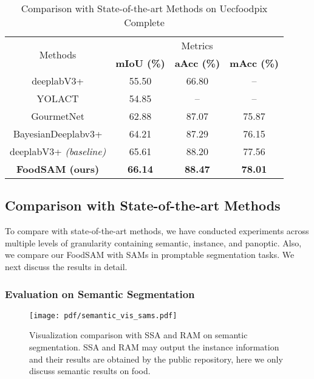 \documentclass[lettersize,journal]{IEEEtran}
\begin{document}
\begin{table}[]
\centering
\caption{Comparison with State-of-the-art Methods on Uecfoodpix Complete}
\begin{tabular}{c|ccc}
\hline
\multicolumn{1}{c}{\multirow{2}{*}{Methods}} & \multicolumn{3}{c}{Metrics}                   \\ \cline{2-4} 
\multicolumn{1}{c}{}                         & \textbf{mIoU (\%)} & \textbf{aAcc (\%)} & \textbf{mAcc (\%)} \\ \hline
deeplabV3+ \cite{chen2018encoder,okamoto2021uec}             & 55.50 & 66.80 & --    \\
YOLACT \cite{battini2023segmented}                 & 54.85 & --    & --    \\
GourmetNet\cite{sharma2021gourmetnet}             & 62.88 & 87.07    & 75.87    \\
BayesianDeeplabv3+\cite{aguilar2022bayesian}     & 64.21 & 87.29 & 76.15 \\
\hline
deeplabV3+ \emph{(baseline)} & 65.61 & 88.20 & 77.56 \\
\textbf{FoodSAM (ours)} & \textbf{66.14}    & \textbf{88.47}    & \textbf{78.01}    \\ \hline
\end{tabular}
\captionsetup{justification=centering}
\label{tab:uec sota}
\end{table} 
\subsection{Comparison with State-of-the-art Methods}
To compare with state-of-the-art methods, we have conducted experiments across multiple levels of granularity containing semantic, instance, and panoptic. 
Also, we compare our FoodSAM with SAMs in promptable segmentation tasks. 
We next discuss the results in detail.

\subsubsection*{Evaluation on Semantic Segmentation}


\begin{figure*}[tbh]
\centering
\newpage
\texttt{[image: pdf/semantic\_vis\_sams.pdf]}
\caption{Visualization comparison with SSA and RAM on semantic segmentation. SSA and RAM may output the instance information and their results are obtained by the public repository, here we only discuss semantic results on food.}
\label{fig: semantic vis vs. sams}
\end{figure*}
\end{document}
